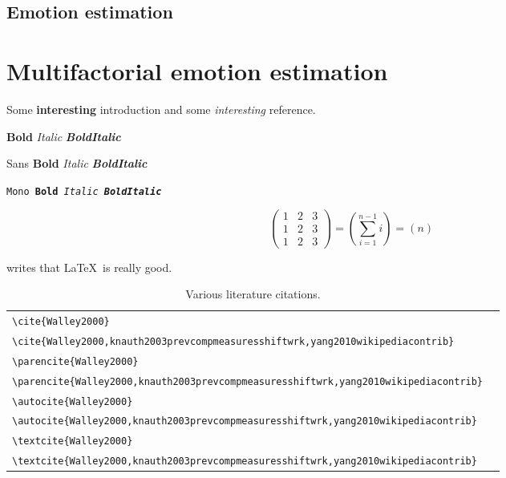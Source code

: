   \subsection{Emotion estimation}
\section{Multifactorial emotion estimation}

Some \textbf{interesting} \textsf{introduction} and some \emph{interesting} reference.
\par\textbf{Bold} \textit{Italic} \textbf{\textit{BoldItalic}}
\par\textsf{Sans \textbf{Bold} \textit{Italic} \textbf{\textit{BoldItalic}}}
\par\texttt{Mono \textbf{Bold} \textit{Italic} \textbf{\textit{BoldItalic}}}

\begin{equation*}
    \begin{pmatrix}
      1 & 2 & 3  \\
      1 & 2 & 3  \\
      1 & 2 & 3
    \end{pmatrix}
    = \left( \sum_{i=1}^{n-1} i \right)
    = \left( n \right)
\end{equation*}

\textcite{Walley2000} writes that \LaTeX\ is really good.

\begin{table}
\begin{tabular}{L{.6\linewidth}L{.3\linewidth}}%
\toprule%
\lstinline|\cite{Walley2000}| & \cite{Walley2000} \\[0.5em]%
\lstinline|\cite{Walley2000,knauth2003prevcompmeasuresshiftwrk,yang2010wikipediacontrib}| & \cite{Walley2000,knauth2003prevcompmeasuresshiftwrk,yang2010wikipediacontrib} \\
\midrule%
\lstinline|\parencite{Walley2000}| & \parencite{Walley2000} \\[0.5em]%
\lstinline|\parencite{Walley2000,knauth2003prevcompmeasuresshiftwrk,yang2010wikipediacontrib}| & \parencite{Walley2000,knauth2003prevcompmeasuresshiftwrk,yang2010wikipediacontrib} \\
\midrule%
\lstinline|\autocite{Walley2000}| & \autocite{Walley2000} \\[0.5em]%
\lstinline|\autocite{Walley2000,knauth2003prevcompmeasuresshiftwrk,yang2010wikipediacontrib}| & \autocite{Walley2000,knauth2003prevcompmeasuresshiftwrk,yang2010wikipediacontrib} \\
\midrule%
\lstinline|\textcite{Walley2000}| & \textcite{Walley2000} \\[0.5em]%
\lstinline|\textcite{Walley2000,knauth2003prevcompmeasuresshiftwrk,yang2010wikipediacontrib}| & \textcite{Walley2000,knauth2003prevcompmeasuresshiftwrk,yang2010wikipediacontrib} \\
\bottomrule%
\end{tabular}%
\caption{Various literature citations.}
\end{table}


